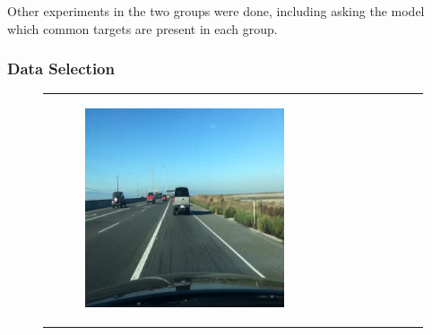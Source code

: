 Other experiments in the two groups were done, including asking the model which 
common targets are present in each group.

\subsubsection{Data Selection}
\setlength{\subfigwidth}{45mm}
\setlength{\horspace}{.3\textwidth}
\begin{figure}
    \centering
    \begin{tabular}{p{\horspace} p{\horspace} p{\horspace}}
    \begin{subfigure}[b]{\subfigwidth}
        \includegraphics[width=\subfigwidth]{images/gpt4/s1.jpg}
    \end{subfigure}
    \hfill &
    \begin{subfigure}[b]{\subfigwidth}

\end{subfigure}
\end{tabular}
\end{figure}
